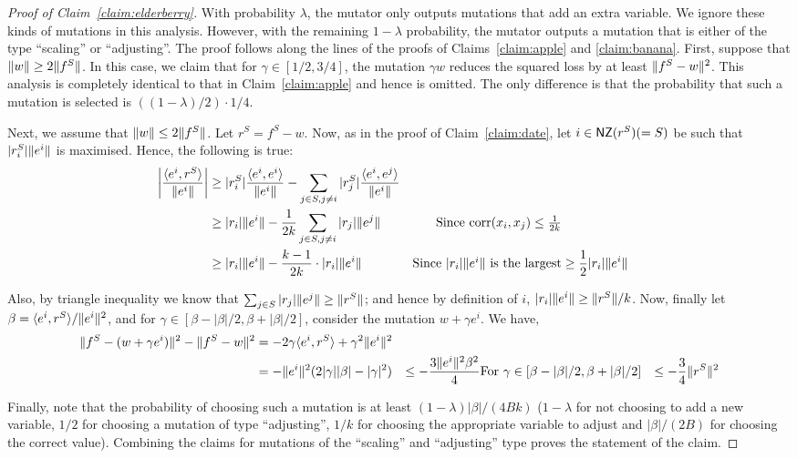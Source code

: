\begin{proof}[Proof of Claim~\ref{claim:elderberry}] With probability $\lambda$,
the mutator only outputs mutations that add an extra variable. We ignore these
kinds of mutations in this analysis. However, with the remaining $1 - \lambda$
probability, the mutator outputs a mutation that is either of the type
``scaling'' or ``adjusting''. The proof follows along the lines of the proofs of
Claims~\ref{claim:apple} and \ref{claim:banana}. First, suppose that
$\Vert w \Vert \geq 2 \Vert f^S \Vert$. In this case, we claim that for $\gamma
\in [1/2, 3/4]$, the mutation $\gamma w$ reduces the squared loss by at least
$\Vert f^S - w \Vert^2$. This analysis is completely identical to that in
Claim~\ref{claim:apple} and hence is omitted. The only difference is that the
probability that such a mutation is selected is $((1 - \lambda)/2) \cdot 1/4$. 

Next, we assume that $\Vert w \Vert \leq 2 \Vert f^S \Vert$. Let $r^S = f^S - w$.
Now, as in the proof of Claim~\ref{claim:date}, let $i \in \mathsf{NZ}(r^S) (= S)$ be
such that $|r^S_i| \Vert e^i \Vert$ is maximised. Hence, the following is true:
\begin{align*}
\left| \frac{\langle e^i, r^S \rangle}{\Vert e^i \Vert} \right| &\geq |r^S_i|
\frac{\langle e^i, e^i \rangle}{\Vert e^i \Vert} - \sum_{j \in S, j \neq i} |r^S_j|
\frac{\langle e^i, e^j \rangle}{\Vert e^i \Vert} \\
&\geq |r_i| \Vert e^i \Vert - \frac{1}{2k} \sum_{j \in S, j \neq i} |r_j| \Vert e^j \Vert
&\mbox{Since $\mathrm{corr}(x_i, x_j) \leq \frac{1}{2k}$} \\
&\geq |r_i| \Vert e^i \Vert - \frac{k-1}{2k} \cdot |r_i| \Vert e^i \Vert &
\mbox{Since $|r_i| \Vert e^i \Vert$ is the largest}
&\geq \frac{1}{2} |r_i| \Vert e^i \Vert 
\end{align*}

Also, by triangle inequality we know that $\sum_{j \in S} |r_j| \Vert e^j \Vert
\geq \Vert r^S \Vert$; and hence by definition of $i$, $|r_i| \Vert e^i \Vert \geq
\Vert r^S \Vert/k$. Now, finally let $\beta = \langle e^i, r^S \rangle/\Vert e^i \Vert^2$,
and for $\gamma \in [\beta - |\beta|/2, \beta + |\beta|/2]$, consider the
mutation $w + \gamma e^i$. We have,
\begin{align*}
\Vert f^S - (w + \gamma e^i) \Vert^2 - \Vert f^S - w \Vert^2 &= -2 \gamma
\langle e^i, r^S \rangle + \gamma^2 \Vert e^i \Vert^2 \\
&= - \Vert e^i \Vert^2(2 |\gamma| |\beta| - |\gamma|^2)
&\leq - \frac{ 3 \Vert e^i \Vert^2 \beta^2}{4} &\mbox{For $\gamma \in [\beta -
|\beta|/2, \beta + |\beta|/2]$}
&\leq - \frac{3}{4} \Vert r^S \Vert^2
\end{align*}

Finally, note that the probability of choosing such a mutation is at least $(1 -
\lambda)|\beta|/(4Bk)$ ($1 - \lambda$ for not choosing to add a new variable,
$1/2$ for choosing a mutation of type ``adjusting'', $1/k$ for choosing the
appropriate variable to adjust and $|\beta|/(2B)$ for choosing the correct
value). Combining the claims for mutations of the ``scaling'' and ``adjusting''
type proves the statement of the claim.
\end{proof}

